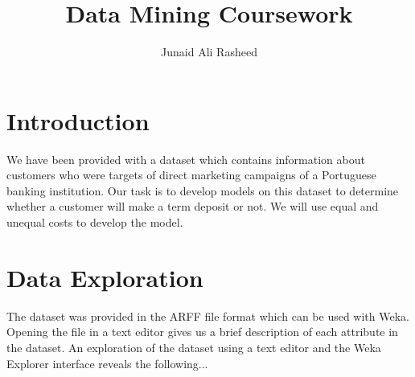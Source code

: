 \documentclass[a4paper,11pt]{article}
\title{Data Mining Coursework}
\author{Junaid Ali Rasheed}
\begin{document}
\maketitle

\begin{abstract}
\end{abstract}

\section{Introduction}
We have been provided with a dataset which contains information about customers
who were targets of direct marketing campaigns of a Portuguese banking institution.
Our task is to develop models on this dataset to determine whether a customer
will make a term deposit or not. We will use equal and unequal costs to develop
the model.

\section{Data Exploration}

The dataset was provided in the ARFF file format which can be used with Weka. Opening
the file in a text editor gives us a brief description of each attribute in the dataset.
An exploration of the dataset using a text editor and the Weka Explorer interface
reveals the following...
\end{document}
